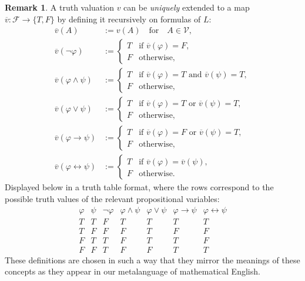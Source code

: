 \documentclass[12pt]{article}
\theoremstyle{definition}
\newtheorem{remark}[theorem]{Remark}
\newcommand{\isp}[1]{\quad\text{#1}\quad}
\renewcommand{\phi}{\varphi}
\newcommand{\<}{\langle}
\renewcommand{\>}{\rangle}
\newcommand{\clo}{\overline}
\newcommand{\FF}{\mathcal{F}}
\newcommand{\VV}{\mathcal{V}}
\newcommand{\liff}{\leftrightarrow}
\begin{document}
\begin{remark}
    A truth valuation $v$ can be \emph{uniquely} extended to a map $\clo{v} : \FF \to \{T, F\}$ by defining it recursively on formulas of $L$:
    \begin{align*}
        \clo{v}(A) &:= v(A) \isp{for} A \in \VV, \\
        \clo{v}(\lnot \phi) &:= \begin{cases}
            T & \text{if } \clo{v}(\phi) = F, \\
            F & \text{otherwise},
        \end{cases} \\
        \clo{v}(\phi \land \psi) &:= \begin{cases}
            T & \text{if } \clo{v}(\phi) = T \text{ and } \clo{v}(\psi) = T, \\
            F & \text{otherwise},
        \end{cases} \\
        \clo{v}(\phi \lor \psi) &:= \begin{cases}
            T & \text{if } \clo{v}(\phi) = T \text{ or } \clo{v}(\psi) = T, \\
            F & \text{otherwise},
        \end{cases} \\
        \clo{v}(\phi \to \psi) &:= \begin{cases}
            T & \text{if } \clo{v}(\phi) = F \text{ or } \clo{v}(\psi) = T, \\
            F & \text{otherwise},
        \end{cases} \\
        \clo{v}(\phi \liff \psi) &:= \begin{cases}
            T & \text{if } \clo{v}(\phi) = \clo{v}(\psi), \\
            F & \text{otherwise}.
        \end{cases}
    \end{align*}
        Displayed below in a truth table format, where the rows correspond to the possible truth values of the relevant propositional variables:
    \[
        \begin{array}{cc|c|c|c|c|c}
            \phi & \psi & \lnot\phi & \phi\land\psi & \phi\lor\psi & \phi\to\psi & \phi\liff\psi \\
            \hline
            T & T & F & T & T & T & T \\
            T & F & F & F & T & F & F \\
            F & T & T & F & T & T & F \\
            F & F & T & F & F & T & T
        \end{array}
    \]
    These definitions are chosen in such a way that they mirror the meanings of these concepts as they appear in our metalanguage of mathematical English.


\end{remark}
\end{document}
